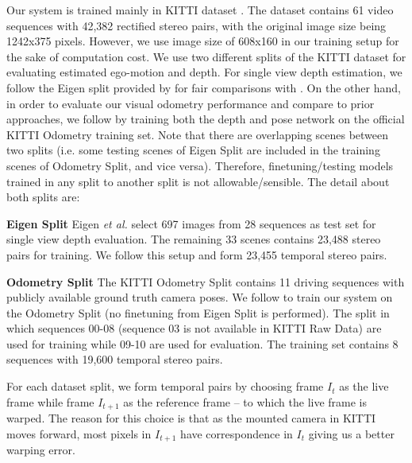 \documentclass[10pt,twocolumn,letterpaper]{article}
\begin{document}
Our system is trained mainly in KITTI dataset \cite{Geiger2013kitti}\cite{Geiger2012kitti}. 
The dataset contains 61 video sequences with 42,382 rectified stereo pairs, with the original image size being 1242x375 pixels. However, we use image size of 608x160 in our training setup for the sake of computation cost. 
%
We use two different splits of the KITTI dataset for evaluating estimated ego-motion and depth. For single view depth estimation, we follow the Eigen split provided by \cite{eigen2014depth} for fair comparisons with \cite{garg2016depth,godard2016depth,eigen2014depth,liu2016depth}. 
On the other hand, in order to evaluate our visual odometry performance and compare to prior approaches, we follow \cite{zhou2017sfmlearner} by training both the depth and pose network on the official KITTI Odometry training set. Note that there are overlapping scenes between two splits (i.e. some testing scenes of Eigen Split are included in the training scenes of Odometry Split, and vice versa). Therefore, finetuning/testing models trained in any split to another split is not allowable/sensible.
The detail about both splits are:

\noindent\textbf{Eigen Split} 
Eigen \textit{et al.} \cite{eigen2014depth} select 697 images from 28 sequences as test set for single view depth evaluation. The remaining 33 scenes contains 23,488 stereo pairs for training. We  follow this setup and form 23,455 temporal stereo pairs. 

\noindent\textbf{Odometry Split}
The KITTI Odometry Split \cite{Geiger2012kitti} contains 11 driving sequences with publicly available ground truth camera poses.
We follow \cite{zhou2017sfmlearner} to train our system on the Odometry Split (no finetuning from Eigen Split is performed). The split in which sequences 00-08 (sequence 03 is not available in KITTI Raw Data) are used for training while 09-10 are used for evaluation. The training set contains 8 sequences with 19,600 temporal stereo pairs.

For each dataset split, we form temporal pairs by choosing frame $I_t$ as the live frame while frame $I_{t+1}$ as the reference frame -- to which the live frame is warped. The reason for this choice is that as the mounted camera in KITTI moves forward, most pixels in $I_{t+1}$ have correspondence in $I_{t}$ giving us a better warping error.
\end{document}
